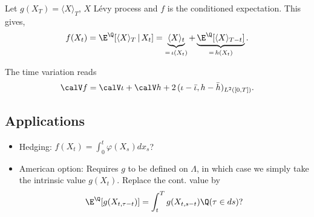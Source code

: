 \begin{example}
Let $g(X_T)=\langle X \rangle_T$, $X$ L\'evy process and $f$ is the conditioned expectation. This gives, 
$$f(X_t) = \E^{\Q}[ \langle X \rangle_T\, | \, X_t] = \underbrace{\langle X \rangle_t}_{= \, \iota(X_t)} + \underbrace{\E^{\Q}[\langle X \rangle_{T-t}]}_{=\,h(X_t)}.$$
\end{example}

The time variation reads 
$$\calV f = \calV \iota + \calV h + 2\, (\iota - \bar{\iota},h - \bar{h})_{L^2([0,T])}.$$



\subsection{Applications}
\begin{itemize}
    \item Hedging: $f(X_t) = \int_0^t \varphi(X_s) dx_s$?
    \item American option: Requires $g$ to be defined on $\Lambda$, in which case we simply take the intrinsic value $g(X_t)$. Replace the cont. value by $$\E^{\Q} [g(X_{t,\tau-t})] = \int_t^T g(X_{t,s-t}) \Q(\tau \in ds)?$$
\end{itemize}